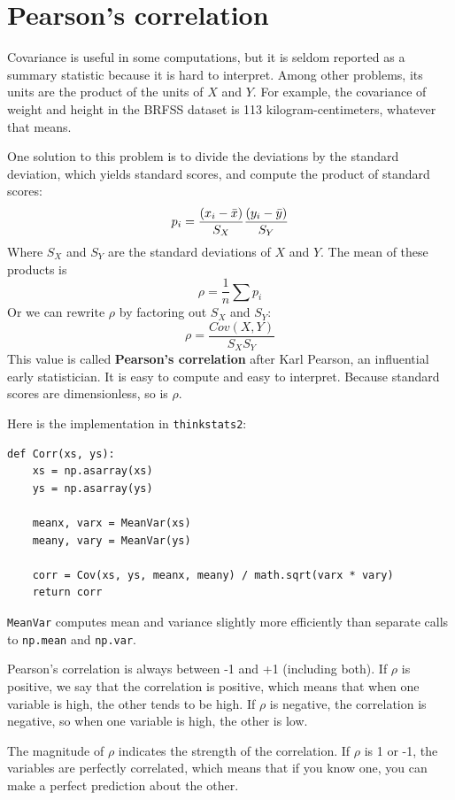 \documentclass[12pt]{book}
\begin{document}
\section{Pearson's correlation}

Covariance is useful in some computations, but it is seldom reported
as a summary statistic because it is hard to interpret.  Among other
problems, its units are the product of the units of $X$ and $Y$.  For
example, the covariance of weight and height in the BRFSS dataset is
113 kilogram-centimeters, whatever that means.

One solution to this problem is to divide the deviations by the standard
deviation, which yields standard scores, and compute the product of
standard scores:
%
\[ p_i = \frac{(x_i - \bar{x})}{S_X} \frac{(y_i - \bar{y})}{S_Y} \]
%
Where $S_X$ and $S_Y$ are the standard deviations of $X$ and $Y$.
The mean of these products is 
%
\[ \rho = \frac{1}{n} \sum p_i \]
%
Or we can rewrite $\rho$ by factoring out $S_X$ and
$S_Y$:
%
\[ \rho = \frac{Cov(X,Y)}{S_X S_Y} \]
%
This value is called {\bf Pearson's correlation} after Karl Pearson,
an influential early statistician.  It is easy to compute and easy to
interpret.  Because standard scores are dimensionless, so is $\rho$.

Here is the implementation in {\tt thinkstats2}:

\begin{verbatim}
def Corr(xs, ys):
    xs = np.asarray(xs)
    ys = np.asarray(ys)

    meanx, varx = MeanVar(xs)
    meany, vary = MeanVar(ys)

    corr = Cov(xs, ys, meanx, meany) / math.sqrt(varx * vary)
    return corr
\end{verbatim}

{\tt MeanVar} computes mean and variance slightly more efficiently
than separate calls to {\tt np.mean} and {\tt np.var}.

Pearson's correlation is always between -1 and +1 (including both).
If $\rho$ is positive, we say that the correlation is positive,
which means that when one variable is high, the other tends to be
high.  If $\rho$ is negative, the correlation is negative, so
when one variable is high, the other is low.

The magnitude of $\rho$ indicates the strength of the correlation.  If
$\rho$ is 1 or -1, the variables are perfectly correlated, which means
that if you know one, you can make a perfect prediction about the
other.  
\end{document}
